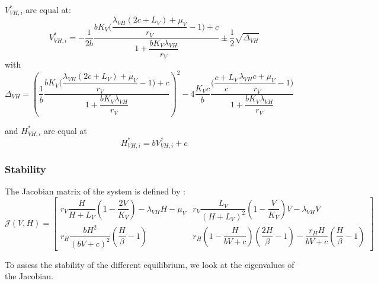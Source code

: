 \documentclass{article}
\newcommand{\lv}{\lambda_{VH}}
\begin{document}
$V^{*}_{VH,i}$ are equal at:
\begin{equation}
V^{*}_{VH,i} = -\dfrac{1}{2b} \dfrac{ bK_V\Big(\dfrac{\lv(2c+L_V) + \mu_V}{r_V} - 1\Big) + c}{1 + \dfrac{b K_V \lv}{r_V}}  \pm \dfrac{1}{2} \sqrt{\Delta_{VH}}
\label{equilibreVH:V}
\end{equation}
with $\Delta_{VH} = \left(\dfrac{1}{b} \dfrac{ bK_V\Big(\dfrac{\lv(2c+L_V) + \mu_V}{r_V} - 1\Big) + c}{1 + \dfrac{b K_V \lv}{r_V}}\right)^2 - 4 \dfrac{K_Vc}{b} \dfrac{\Big(\dfrac{c+L_V}{c} \dfrac{\lv c + \mu_V}{r_V} - 1\Big)}{1 + \dfrac{b K_V \lv}{r_V}} $

and $H^*_{VH,i}$ are equal at
\begin{equation}
H^*_{VH,i} = b V^*_{VH,i} + c
\label{equilibreVH:H}
\end{equation}

\subsubsection{Stability}
The Jacobian matrix of the system is defined by :
\begin{equation}
\mathcal{J}(V,H) =  \begin{bmatrix}
r_V \dfrac{H}{H+L_V}(1-\dfrac{2V}{K_V}) - \lv H - \mu_V & r_V \dfrac{L_V}{(H+L_V)^2}(1-\dfrac{V}{K_V})V  - \lv V\\
r_H \dfrac{bH^2}{(bV+c)^2} (\dfrac{H}{\beta}-1) & r_H(1-\dfrac{H}{bV+c})(\dfrac{2H}{\beta}-1) - \dfrac{r_H H}{bV+c}(\dfrac{H}{\beta}-1)
\end{bmatrix}
\label{stabilityVH:jacobian}
\end{equation}

To assess the stability of the different equilibrium, we look at the eigenvalues of the Jacobian.
\end{document}
